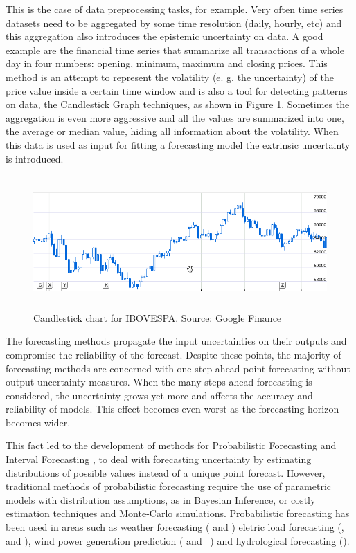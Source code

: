 This is the case of data preprocessing tasks, for example. Very often time series datasets need to be aggregated by some time resolution (daily, hourly, etc) and this aggregation also introduces the epistemic uncertainty on data. A good example are the financial time series that summarize all transactions of a whole day in four numbers: opening, minimum, maximum and closing prices. This method is an attempt to represent the volatility (e. g. the uncertainty) of the price value inside a certain time window and is also a tool for detecting patterns on data, the Candlestick Graph techniques, as shown in Figure \ref{fig:candlestick}. Sometimes the aggregation is even more aggressive and all the values are summarized into one, the average or median value, hiding all information about the volatility. When this data is used as input for fitting a forecasting model the extrinsic uncertainty is introduced.

\begin{figure}
\includegraphics[width=\textwidth,height=2in]{figures/candlestick.png}
\caption[Candlestick chart for IBOVESPA]%
{Candlestick chart for IBOVESPA. Source: Google Finance\protect\footnotemark}
\label{fig:candlestick}
\end{figure}


The forecasting methods propagate the input uncertainties on their outputs and compromise the reliability of the forecast. Despite these points, the majority of forecasting methods are concerned with one step ahead point forecasting without output uncertainty measures. When the many steps ahead forecasting is considered, the uncertainty grows yet more and affects the accuracy and reliability of models. This effect becomes even worst  as the forecasting horizon becomes wider.

This fact led to the development of methods for Probabilistic Forecasting \cite{Gneiting2014b} and  Interval Forecasting \cite{Chatfield1993},  to deal with forecasting uncertainty by estimating distributions of possible values instead of a unique point forecast. However, traditional methods of probabilistic forecasting require the use of parametric models with distribution assumptions, as in Bayesian Inference, or costly estimation techniques and Monte-Carlo simulations. Probabilistic forecasting has been used in areas such as weather forecasting (\cite{Fraley2011} and \cite{Leutbecher2008}) eletric load forecasting (\cite{Hong2016}, \cite{Hong2016a} and \cite{Liu2015}), wind power generation prediction (\cite{Pinson2006} and  \cite{Netto2016}) and hydrological forecasting (\cite{Laio2007}).

